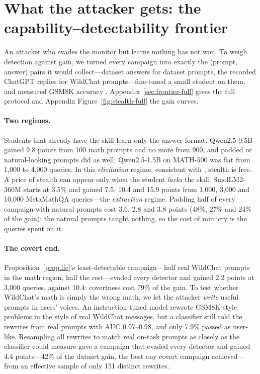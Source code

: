 \section{What the attacker gets: the capability--detectability frontier}
\label{sec:frontier}

An attacker who evades the monitor but learns nothing has not won. To weigh detection against gain, we turned every campaign into exactly the (prompt, answer) pairs it would collect---dataset answers for dataset prompts, the recorded ChatGPT replies for WildChat prompts---fine-tuned a small student on them, and measured GSM8K accuracy \citep{cobbe2021gsm8k}. Appendix~\ref{sec:frontier-full} gives the full protocol and Appendix Figure~\ref{fig:stealth-full} the gain curves.

\paragraph{Two regimes.} Students that already have the skill learn only the answer format. Qwen2.5-0.5B \citep{qwen2024qwen25} gained 9.8 points from 100 math prompts and no more from 900, and padded or natural-looking prompts did as well; Qwen2.5-1.5B on MATH-500 was flat from 1{,}000 to 4{,}000 queries. In this \emph{elicitation} regime, consistent with \citet{gudibande2024false}, stealth is free. A price of stealth can appear only when the student \emph{lacks} the skill. SmolLM2-360M \citep{allal2025smollm2} starts at 3.5\% and gained 7.5, 10.4 and 15.9 points from 1{,}000, 3{,}000 and 10{,}000 MetaMathQA queries---the \emph{extraction} regime. Padding half of every campaign with natural prompts cost 3.6, 2.8 and 3.8 points (48\%, 27\% and 24\% of the gain): the natural prompts taught nothing, so the cost of mimicry is the queries spent on it.

\paragraph{The covert end.} Proposition~\ref{prop:lfc}'s least-detectable campaign---half real WildChat prompts in the math region, half the rest---evaded every detector and gained 2.2 points at 3{,}000 queries, against 10.4: covertness cost 79\% of the gain. To test whether WildChat's math is simply the wrong math, we let the attacker \emph{write} useful prompts in users' voices. An instruction-tuned model rewrote GSM8K-style problems in the style of real WildChat messages, but a classifier still told the rewrites from real prompts with AUC 0.97--0.98, and only 7.9\% passed as user-like. Resampling all rewrites to match real on-task prompts as closely as the classifier could measure gave a campaign that evaded every detector and gained 4.4 points---42\% of the dataset gain, the best any covert campaign achieved---from an effective sample of only 151 distinct rewrites.

